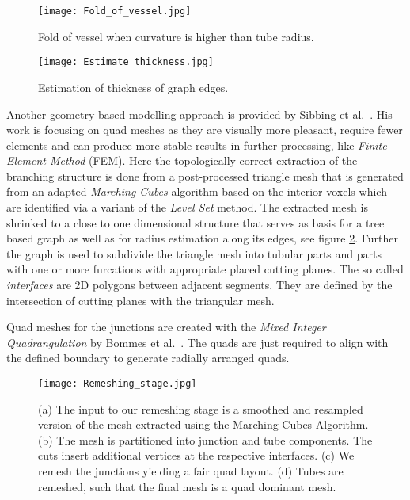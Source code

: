 \begin{figure}[h]
	\centering
	\texttt{[image: Fold\_of\_vessel.jpg]} \\
	\caption{Fold of vessel when curvature is higher than tube radius.}
	\cite{volkau2005geometric}
	\label{fig:Fold_of_vessel}
\end{figure}

\begin{figure}[h]
	\centering
	\texttt{[image: Estimate\_thickness.jpg]} \\
	\caption{Estimation of thickness of graph edges.}
	\cite{sibbing2012topology}
	\label{fig:Estimate_thickness}
\end{figure}

Another geometry based modelling approach is provided by Sibbing et al.~\cite{sibbing2012topology}.
His work is focusing on quad meshes as they are visually more pleasant, require fewer elements and can produce more stable results in further processing, like \emph{Finite Element Method} (FEM). Here the topologically correct extraction of the branching structure is done from a post-processed triangle mesh that is generated from an adapted \emph{Marching Cubes} algorithm based on the interior voxels which are identified via a variant of the \emph{Level Set} method. The extracted mesh is shrinked to a close to one dimensional structure that serves as basis for a tree based graph as well as for radius estimation along its edges, see figure \ref{fig:Estimate_thickness}. Further the graph is used to subdivide the triangle mesh into tubular parts and parts with one or more furcations with appropriate placed cutting planes. The so called \emph{interfaces} are 2D polygons between adjacent segments. They are defined by the intersection of cutting planes with the triangular mesh. 

Quad meshes for the junctions are created with the \emph{Mixed Integer Quadrangulation} by Bommes et al.~\cite{bommes2009mixed}. The quads are just required to align with the defined boundary to generate radially arranged quads.

\begin{figure}[h]
	\centering
	\texttt{[image: Remeshing\_stage.jpg]} \\
	\caption{ (a) The input to our remeshing stage is a smoothed and resampled version of the mesh extracted using the Marching Cubes Algorithm. (b) The mesh is partitioned into junction and tube components. The cuts insert additional vertices at the respective interfaces. (c) We remesh the junctions yielding a fair quad layout. (d) Tubes are remeshed, such that the final mesh is a quad dominant mesh.}
	\cite{sibbing2012topology}
	\label{fig:Remeshing_stage}
\end{figure}

